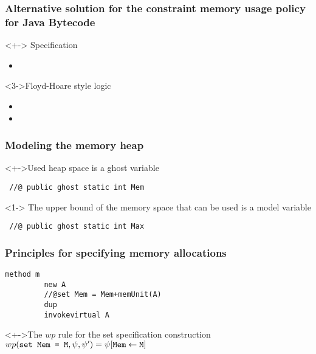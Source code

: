 \documentclass{beamer}
\begin{document}
\begin{frame}
\frametitle{Alternative solution for the constraint memory usage policy for Java Bytecode}

    \begin{block}<+->{ Specification }
     \begin{itemize}
       
       \item {}
 
    \end{itemize}
   \end{block}

  \begin{block}<3->{Floyd-Hoare style logic }
     \begin{itemize}
           \item {} 
           \item  {}
           
    \end{itemize}
   \end{block}
\end{frame}

\begin{frame}[containsverbatim] \frametitle{Modeling the memory heap}  
  \begin{block}<+->{Used heap space is a ghost variable}
    \begin{verbatim} //@ public ghost static int Mem \end{verbatim}
  \end{block}
  

  \begin{block}<1->{ The upper bound of the memory space that can be used is a model variable}
    \begin{verbatim} //@ public ghost static int Max \end{verbatim}   
  \end{block}
\end{frame}


\begin{frame} \frametitle{Principles for specifying memory allocations}
  \begin{Example} {
    \begin{lstlisting}[language=jvmis]
      method m
         new A
         //@set Mem = Mem+memUnit(A)
         dup
         invokevirtual A
    \end{lstlisting}
 }   
  \end{Example} 
  
  \begin{block}<+->{The $wp$ rule for the set specification construction }
     $wp(\verb!set Mem = M! , \psi , \psi') = \psi[\verb!Mem! \leftarrow \verb!M!] $
  \end{block}
\end{frame}
\end{document}
